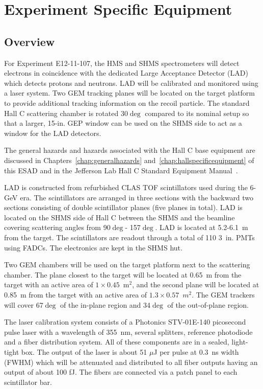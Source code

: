 \chapter{Experiment Specific Equipment}
\label{chap:expspecific}



\section{Overview}
For Experiment E12-11-107, the HMS and SHMS spectrometers will detect electrons in coincidence with the dedicated Large Acceptance Detector (LAD) which detects protons and neutrons. LAD will be calibrated and monitored using a laser system. Two GEM tracking planes will be located on the target platform to provide additional tracking information on the recoil particle. The standard Hall C scattering chamber is rotated 30$\deg$ compared to its nominal setup so that a larger, 15-in. GEP window can be used on the SHMS side to act as a window for the LAD detectors. 

The general hazards and hazards associated with the Hall C base
equipment are discussed in Chapters~\ref{chap:generalhazards}
and~\ref{chap:hallspecificequipment} of this ESAD and in the Jefferson
Lab Hall C Standard Equipment Manual~\cite{HallCosp}.

LAD is constructed from refurbished CLAS TOF scintillators used during the 6-GeV era. The scintillators are arranged in three sections with the backward two sections consisting of double scintillator planes (five planes in total). LAD is located on the SHMS side of Hall C between the SHMS and the beamline covering scattering angles from 90$\deg$- 157$\deg$. LAD is located at 5.2-6.1~m from the target. The scintillators are readout through a total of 110 3~in. PMTs using FADCs. The electronics are kept in the SHMS hut. 

Two GEM chambers will be used on the target platform next to the scattering chamber. The plane closest to the target will be located at 0.65~m from the target with an active area of $1\times 0.45$~m$^2$, and the second plane will be located at 0.85~m from the target with an active area of $1.3\times 0.57$~$m^2$. The GEM trackers will cover 67$\deg$ of the in-plane region and 34$\deg$ of the out-of-plane region.  

The laser calibration system consists of a Photonics STV-01E-140 picosecond pulse laser with a wavelength of 355~nm, several splitters, reference photodiode and a fiber distribution system. All of these components are in
a sealed, light-tight box. The output of the laser is about 51 $\mu$J per pulse at
0.3~ns width (FWHM) which will be attenuated and distributed to all fiber
outputs having an output of about 100 fJ. The fibers are connected via a patch panel to each scintillator bar.

